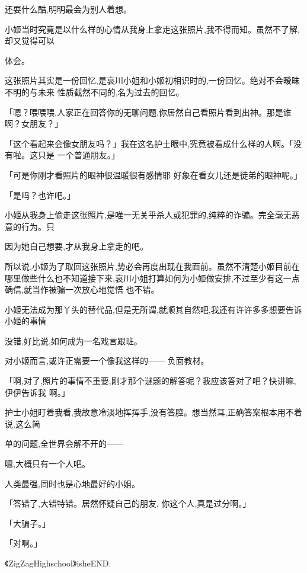 \documentclass{article}
\begin{document}
还耍什么酷,明明最会为别人着想。 

小姬当时究竟是以什么样的心情从我身上拿走这张照片,我不得而知。虽然不了解,却又觉得可以
\newpage

体会。 

这张照片其实是一份回忆,是哀川小姐和小姬初相识时的,一份回忆。绝对不会暧昧不明的与未来
性质截然不同的,名为过去的回忆。 

「嗯？喂喂喂,人家正在回答你的无聊问题,你居然自己看照片看到出神。那是谁啊？女朋友？」

「这个看起来会像女朋友吗？」我在这名护士眼中,究竟被看成什么样的人啊。「没有啦。这只是
一个普通朋友。」 

「可是你刚才看照片的眼神很温暖很有感情耶
好象在看女儿还是徒弟的眼神呢。」 


「是吗？也许吧。」 

小姬从我身上偷走这张照片,是唯一无关乎杀人或犯罪的,纯粹的诈骗。完全毫无恶意的行为。只

\newpage
因为她自己想要,才从我身上拿走的吧。 

所以说,小姬为了取回这张照片,势必会再度出现在我面前。虽然不清楚小姬目前在哪里做些什么也不知道接下来,哀川小姐打算如何为小姬做安排,不过至少有这一点确信,就当作被骗一次放心地觉悟
也不错。 

小姬无法成为那丫头的替代品,但是无所谓,就顺其自然吧,我还有许许多多想要告诉小姬的事情


没错,好比说,如何成为一名戏言跟班。 

对小姬而言,或许正需要一个像我这样的——
负面教材。 

「啊,对了,照片的事情不重要,刚才那个谜题的解答呢？我应该答对了吧？快讲嘛,伊伊告诉我
啊。」 

护士小姐盯着我看,我故意冷淡地挥挥手,没有答腔。想当然耳,正确答案根本用不着说,这么简
\newpage

单的问题,全世界会解不开的—— 


嗯,大概只有一个人吧。 


人类最强,同时也是心地最好的小姐。 

「答错了,大错特错。居然怀疑自己的朋友,
你这个人,真是过分啊。」 


「大骗子。」 


「对啊。」 

《ZigZagHighschool》isheEND.
\end{document}
